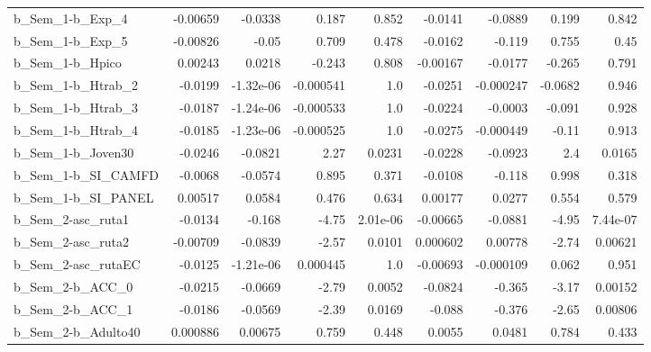 \begin{tabular}{lrrrrrrrr}
b\_Sem\_1-b\_Exp\_4            &    -0.00659 &      -0.0338 &     0.187 &    0.852 &    -0.0141 &     -0.0889 &        0.199 &         0.842 \\
b\_Sem\_1-b\_Exp\_5            &    -0.00826 &        -0.05 &     0.709 &    0.478 &    -0.0162 &      -0.119 &        0.755 &          0.45 \\
b\_Sem\_1-b\_Hpico            &     0.00243 &       0.0218 &    -0.243 &    0.808 &   -0.00167 &     -0.0177 &       -0.265 &         0.791 \\
b\_Sem\_1-b\_Htrab\_2          &     -0.0199 &    -1.32e-06 & -0.000541 &      1.0 &    -0.0251 &   -0.000247 &      -0.0682 &         0.946 \\
b\_Sem\_1-b\_Htrab\_3          &     -0.0187 &    -1.24e-06 & -0.000533 &      1.0 &    -0.0224 &     -0.0003 &       -0.091 &         0.928 \\
b\_Sem\_1-b\_Htrab\_4          &     -0.0185 &    -1.23e-06 & -0.000525 &      1.0 &    -0.0275 &   -0.000449 &        -0.11 &         0.913 \\
b\_Sem\_1-b\_Joven30          &     -0.0246 &      -0.0821 &      2.27 &   0.0231 &    -0.0228 &     -0.0923 &          2.4 &        0.0165 \\
b\_Sem\_1-b\_SI\_CAMFD         &     -0.0068 &      -0.0574 &     0.895 &    0.371 &    -0.0108 &      -0.118 &        0.998 &         0.318 \\
b\_Sem\_1-b\_SI\_PANEL         &     0.00517 &       0.0584 &     0.476 &    0.634 &    0.00177 &      0.0277 &        0.554 &         0.579 \\
b\_Sem\_2-asc\_ruta1          &     -0.0134 &       -0.168 &     -4.75 & 2.01e-06 &   -0.00665 &     -0.0881 &        -4.95 &      7.44e-07 \\
b\_Sem\_2-asc\_ruta2          &    -0.00709 &      -0.0839 &     -2.57 &   0.0101 &   0.000602 &     0.00778 &        -2.74 &       0.00621 \\
b\_Sem\_2-asc\_rutaEC         &     -0.0125 &    -1.21e-06 &  0.000445 &      1.0 &   -0.00693 &   -0.000109 &        0.062 &         0.951 \\
b\_Sem\_2-b\_ACC\_0            &     -0.0215 &      -0.0669 &     -2.79 &   0.0052 &    -0.0824 &      -0.365 &        -3.17 &       0.00152 \\
b\_Sem\_2-b\_ACC\_1            &     -0.0186 &      -0.0569 &     -2.39 &   0.0169 &     -0.088 &      -0.376 &        -2.65 &       0.00806 \\
b\_Sem\_2-b\_Adulto40         &    0.000886 &      0.00675 &     0.759 &    0.448 &     0.0055 &      0.0481 &        0.784 &         0.433 \\

\end{tabular}
